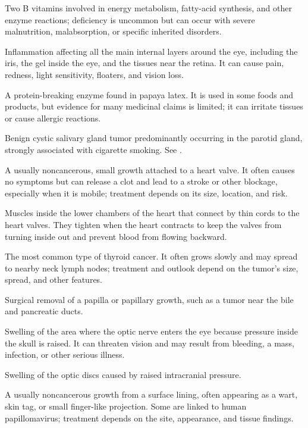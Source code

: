  Two B vitamins involved in energy metabolism, fatty-acid synthesis, and other enzyme reactions; deficiency is uncommon but can occur with severe malnutrition, malabsorption, or specific inherited disorders.

 Inflammation affecting all the main internal layers around the eye, including the iris, the gel inside the eye, and the tissues near the retina. It can cause pain, redness, light sensitivity, floaters, and vision loss.

 A protein-breaking enzyme found in papaya latex. It is used in some foods and products, but evidence for many medicinal claims is limited; it can irritate tissues or cause allergic reactions.

 Benign cystic salivary gland tumor predominantly occurring in the parotid gland, strongly associated with cigarette smoking. See .

 A usually noncancerous, small growth attached to a heart valve. It often causes no symptoms but can release a clot and lead to a stroke or other blockage, especially when it is mobile; treatment depends on its size, location, and risk.

 Muscles inside the lower chambers of the heart that connect by thin cords to the heart valves. They tighten when the heart contracts to keep the valves from turning inside out and prevent blood from flowing backward.

 The most common type of thyroid cancer. It often grows slowly and may spread to nearby neck lymph nodes; treatment and outlook depend on the tumor's size, spread, and other features.

 Surgical removal of a papilla or papillary growth, such as a tumor near the bile and pancreatic ducts.

 Swelling of the area where the optic nerve enters the eye because pressure inside the skull is raised. It can threaten vision and may result from bleeding, a mass, infection, or other serious illness.

 Swelling of the optic discs caused by raised intracranial pressure.

 A usually noncancerous growth from a surface lining, often appearing as a wart, skin tag, or small finger-like projection. Some are linked to human papillomavirus; treatment depends on the site, appearance, and tissue findings.


